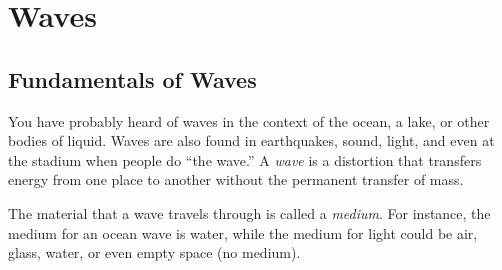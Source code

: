 \chapter{Waves}
	\section{Fundamentals of Waves} 

	You have probably heard of waves in the context of the ocean, a lake, or other bodies of liquid.  Waves are also found in earthquakes, sound, light, and even at the stadium when people do ``the wave.''  A \textit{wave} is a distortion that transfers energy from one place to another without the permanent transfer of mass. 
	
	The material that a wave travels through is called a \textit{medium}.   For instance, the medium for an ocean wave is water, while the medium for light could be air, glass, water, or even empty space (no medium).  

